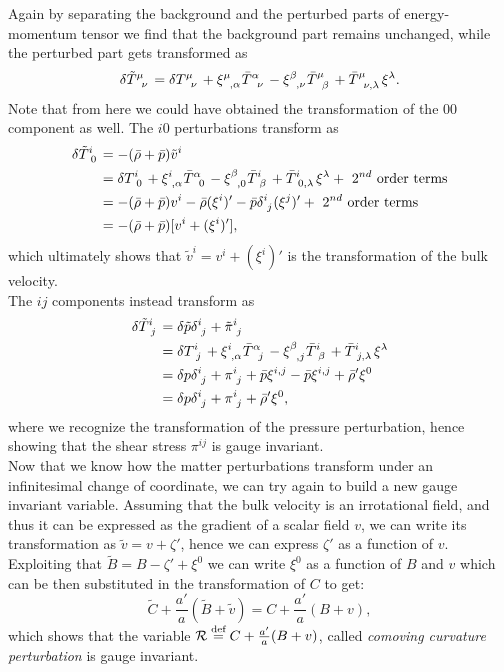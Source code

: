 Again by separating the background and the perturbed parts of energy-momentum tensor we find that the background part remains unchanged, while the perturbed part gets transformed as
$$\delta \tensor{\tilde T}{^\mu_\nu}=\delta \tensor{T}{^\mu_\nu}+\tensor{\xi}{^\mu_{,\alpha}} \tensor{\bar T}{^\alpha_\nu}-\tensor{\xi}{^\beta_{,\nu}} \tensor{\bar T}{^\mu_\beta}+\tensor{\bar T}{^{\mu}_{\nu,\lambda}}\xi^\lambda.$$
Note that from here we could have obtained the transformation of the $00$ component as well. The $i0$ perturbations transform as
\begin{align*}
    \delta  \tensor{\tilde T}{^i_0}&=-(\bar\rho+\bar p)\tilde v^i\\&=\delta \tensor{T}{^i_0}+\tensor{\xi}{^i_{,\alpha}}\tensor{\bar T}{^\alpha_0}-\tensor{\xi}{^\beta_{,0}}\tensor{\bar T}{^{i}_\beta}+\tensor{\bar T}{^{i}_{0,\lambda}}\xi^\lambda+\text{ $2^{nd}$ order terms}\\
    &=-(\bar \rho+\bar p)v^i-\bar\rho(\xi^i)'-\bar p \tensor{\delta}{^{i}_j}(\tensor{\xi}{^{j}})'+\text{ $2^{nd}$ order terms}\\&=-(\bar \rho+\bar p)[v^i+(\xi^i)'],
\end{align*}
which ultimately shows that $\tilde v^i=v^i+(\xi^i)'$ is the transformation of the bulk velocity.\\
The $ij$ components instead transform as
\begin{align*}
    \delta \tensor{\tilde T}{^i_j}&=\delta \tilde p\tensor{\delta}{^i_j}+\tensor{\tilde\pi}{^i_j}\\&=\delta \tensor{T}{^i_j}+\tensor{\xi}{^i_{,\alpha}}\tensor{\bar T}{^\alpha_j}-\tensor{\xi}{^\beta_{,j}}\tensor{\bar T}{^{i}_\beta}+\tensor{\bar T}{^{i}_{j,\lambda}}\xi^\lambda\\
    &=\delta p\tensor{\delta}{^i_j}+\tensor{\pi}{^i_j}+\bar p\xi^{i,j}-\bar p \tensor{\xi}{^{i,j}}+\bar \rho'\xi^0\\     
    &=\delta p\tensor{\delta}{^i_j}+\tensor{\pi}{^i_j}+\bar \rho'\xi^0,
\end{align*}
where we recognize the transformation of the pressure perturbation, hence showing that the shear stress $\pi^{ij}$ is gauge invariant.\\
Now that we know how the matter perturbations transform under an infinitesimal change of coordinate, we can try again to build a new gauge invariant variable. Assuming that the bulk velocity is an irrotational field, and thus it can be expressed as the gradient of a scalar field $v$, we can write its transformation as $\tilde v=v+\zeta'$, hence we can express $\zeta'$ as a function of $v$. Exploiting that $\tilde B=B-\zeta'+\xi^0$ we can write $\xi^0$ as a function of $B$ and $v$ which can be then substituted in the transformation of $C$ to get:
$$\tilde C+\frac{a'}{a}(\tilde B+\tilde v)=C+\frac{a'}{a}(B+v),$$
which shows that the variable $\mathcal{R}\stackrel{\text{def}}{=} C+\frac{a'}{a}(B+v)$, called \emph{comoving curvature perturbation} is gauge invariant.

